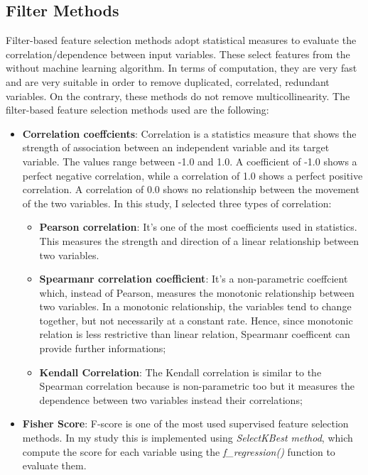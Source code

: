 \subsection{Filter Methods}
Filter-based feature selection methods adopt statistical measures to evaluate the correlation/dependence between input variables.
These select features from the without machine learning algorithm. In terms of computation, they are very fast and are very suitable in order to remove duplicated, correlated, redundant variables. On the contrary,  these methods do not remove multicollinearity.
The filter-based feature selection methods used are the following:
\begin{itemize}
\item \textbf{Correlation coeffcients}: Correlation is a statistics measure that shows the strength of association between an independent variable and its target variable. The values range between -1.0 and 1.0. A coefficient of -1.0 shows a perfect negative correlation, while a correlation of 1.0 shows a perfect positive correlation. A correlation of 0.0 shows no relationship between the movement of the two variables. In this study, I selected three types of correlation:
\begin{itemize}
\item \textbf{Pearson correlation}: It's one of the most coefficients used in statistics. This measures the strength and direction of a linear relationship between two variables. 
\item \textbf{Spearmanr correlation coefficient}: It's a non-parametric coeffcient which, instead of Pearson, measures the monotonic relationship between two variables. In a monotonic relationship, the variables tend to change together, but not necessarily at a constant rate. Hence, since monotonic relation is less restrictive than linear relation, Spearmanr coefficent can provide further informations;
\item \textbf{Kendall Correlation}: The Kendall correlation is similar to the Spearman correlation because is non-parametric too but it measures the dependence between two variables instead their correlations;
\end{itemize}
\item \textbf{Fisher Score}: F-score is one of the most used supervised feature selection methods. In my study this is implemented using \textit{SelectKBest method}, which compute the score for each variable using the \textit{f\_regression()} function to evaluate them.
\end{itemize}


